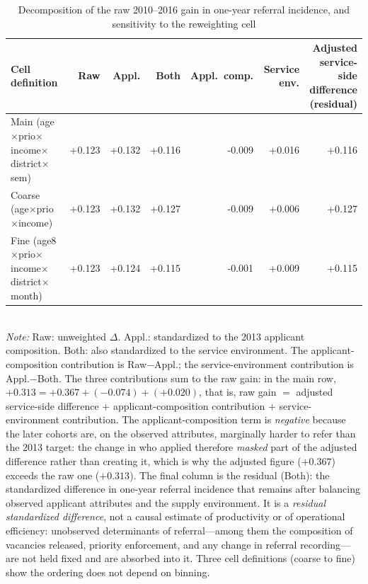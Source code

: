 \begin{table}[htbp]\centering
\caption{Decomposition of the raw 2010--2016 gain in one-year referral incidence, and sensitivity to the reweighting cell}
\label{tab:P3decomp}
\footnotesize
\setlength{\tabcolsep}{4pt}
\begin{tabular}{lrrrrrr}
\toprule
Cell definition & Raw & Appl. & Both & Appl.\ comp. & Service env. & \shortstack[r]{Adjusted\\service-side\\difference\\(residual)} \\
\midrule
Main (age$\times$prio$\times$income$\times$district$\times$sem) & +0.123 & +0.132 & +0.116 & -0.009 & +0.016 & +0.116 \\
Coarse (age$\times$prio$\times$income) & +0.123 & +0.132 & +0.127 & -0.009 & +0.006 & +0.127 \\
Fine (age8$\times$prio$\times$income$\times$district$\times$month) & +0.123 & +0.124 & +0.115 & -0.001 & +0.009 & +0.115 \\
\bottomrule
\end{tabular}
\\[3pt]{\footnotesize \textit{Note:} Raw: unweighted $\Delta$. Appl.: standardized to the 2013 applicant composition. Both: also standardized to the service environment. The applicant-composition contribution is Raw$-$Appl.; the service-environment contribution is Appl.$-$Both. The three contributions sum to the raw gain: in the main row, $+0.313 = +0.367 + (-0.074) + (+0.020)$, that is, raw gain $=$ adjusted service-side difference $+$ applicant-composition contribution $+$ service-environment contribution. The applicant-composition term is \emph{negative} because the later cohorts are, on the observed attributes, marginally harder to refer than the 2013 target: the change in who applied therefore \emph{masked} part of the adjusted difference rather than creating it, which is why the adjusted figure ($+0.367$) exceeds the raw one ($+0.313$). The final column is the residual (Both): the standardized difference in one-year referral incidence that remains after balancing observed applicant attributes and the supply environment. It is a \emph{residual standardized difference}, not a causal estimate of productivity or of operational efficiency: unobserved determinants of referral---among them the composition of vacancies released, priority enforcement, and any change in referral recording---are not held fixed and are absorbed into it. Three cell definitions (coarse to fine) show the ordering does not depend on binning.}
\end{table}
